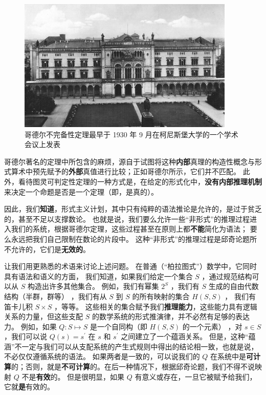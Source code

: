 \documentclass[a4paper,12pt]{article}
\begin{document}
\begin{figure}[ht]
\centering
\includegraphics[height=2.5in]{images/konigsberger_university.jpg}
\caption{哥德尔不完备性定理最早于 1930 年 9 月在柯尼斯堡大学的一个学术会议上发表}
\end{figure}

哥德尔著名的定理\cite{GodelK1931}中所包含的麻烦，源自于试图将这种\textbf{内部}真理的构造性概念与\gls{形式算术}中预先赋予的\textbf{外部}真值进行比较；正如哥德尔所示，它们并不匹配。
此外，看待图灵可判定性定理\cite{TuringA1937}的一种方式是，在给定的\gls{形式化}中，\textbf{没有内部\gls{推理机制}}来决定一个\gls{命题}是否是一个定理（即，是真的）。

因此，我们\textbf{知道}，\gls{形式主义}计划，其中只有纯粹的\gls{语法}推论是允许的，是过于贫乏的，甚至不足以支撑数论。
也就是说，我们要么允许一些“非形式”的\gls{推理过程}进入我们的系统，根据哥德尔定理，这些过程甚至在原则上都\textbf{不能}简化为\gls{语法}； 要么永远把我们自己限制在数论的片段中。
这种“非形式”的\gls{推理过程}是\gls{邱奇论题}所不允许的，它们是\textbf{无效的}。

让我们用更熟悉的术语来讨论上述问题。 在普通（“柏拉图式”）数学中，它同时具有\gls{语法}和\gls{语义}的方面，
我们知道，如果我们给定一个集合 $S$ ，通过规范结构可以从 $S$ 构造出许多其他集合。
例如，我们有幂集 $2^S$ ，我们有 $S$ \gls{生成}的自由代数结构（半群，群等） ，我们有从 $S$ 到 $S$ 的所有映射的集合 $H(S, S)$ ，
我们有笛卡儿积 $S \times S$ ，等等。
这些相关的集合赋予我们\textbf{\gls{推理能力}}，这些能力具有\gls{逻辑关系}的力量，但这些支配 $S$ 的数学系统的形式推演律，并不必然有足够的表达力。
例如，如果 $Q: S \mapsto S$ 是一个自同构（即 $H(S, S)$ 的一个元素） ，对 $s \in S $，我们可以说 $Q(s) = s^{\prime}$ 在 $s$ 和 $s^{\prime}$ 之间建立了一个\gls{蕴涵关系}。
但是，这种“\gls{蕴涵}”不一定与我们可以从支配系统的产生式规则中得出的结论相一致，也就是说，不必仅仅遵循系统的\gls{语法}。
如果两者是一致的，可以说我们的 $Q$ 在系统中是\textbf{\gls{可计算}}的；否则，就是\textbf{\gls{不可计算}}的。在后一种情况下，根据\gls{邱奇论题}，我们不得不说映射 $Q$ 不是\textbf{有效}的。
但是很明显，如果 $Q$ 有意义或存在，一旦它被赋予给我们，它就\textbf{是}有效的。
\end{document}
